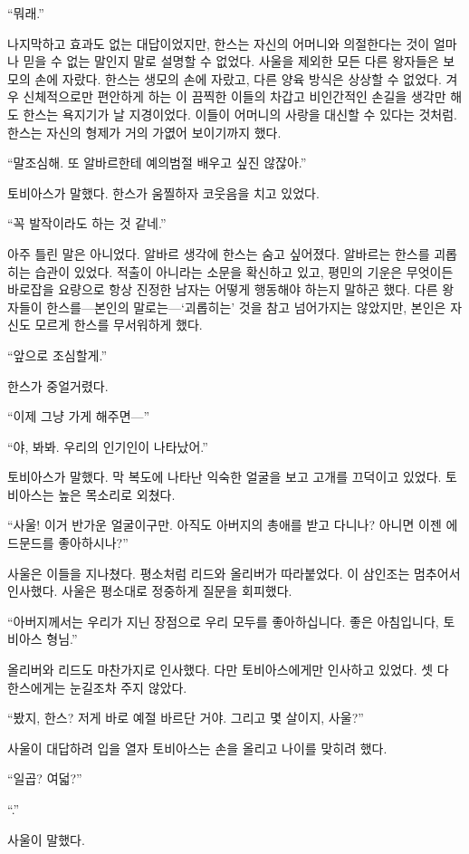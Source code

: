 ``뭐래.''

나지막하고 효과도 없는 대답이었지만, 한스는 자신의 어머니와 의절한다는 것이 얼마나 믿을 수 없는 말인지 말로 설명할 수 없었다. 사울을 제외한 모든 다른 왕자들은 보모의 손에 자랐다. 한스는 생모의 손에 자랐고, 다른 양육 방식은 상상할 수 없었다. 겨우 신체적으로만 편안하게 하는 이 끔찍한 이들의 차갑고 비인간적인 손길을 생각만 해도 한스는 욕지기가 날 지경이었다. 이들이 어머니의 사랑을 대신할 수 있다는 것처럼. 한스는 자신의 형제가 거의 가엾어 보이기까지 했다.

``말조심해. 또 알바르한테 예의범절 배우고 싶진 않잖아.''

토비아스가 말했다. 한스가 움찔하자 코웃음을 치고 있었다.

``꼭 발작이라도 하는 것 같네.''

아주 틀린 말은 아니었다. 알바르 생각에 한스는 숨고 싶어졌다. 알바르는 한스를 괴롭히는 습관이 있었다. 적출이 아니라는 소문을 확신하고 있고, 평민의 기운은 무엇이든 바로잡을 요량으로 항상 진정한 남자는 어떻게 행동해야 하는지 말하곤 했다. 다른 왕자들이 한스를—본인의 말로는—`괴롭히는' 것을 참고 넘어가지는 않았지만, 본인은 자신도 모르게 한스를 무서워하게 했다.

``앞으로 조심할게.''

한스가 중얼거렸다.

``이제 그냥 가게 해주면—''

``야, 봐봐. 우리의 인기인이 나타났어.''

토비아스가 말했다. 막 복도에 나타난 익숙한 얼굴을 보고 고개를 끄덕이고 있었다. 토비아스는 높은 목소리로 외쳤다.

``사울! 이거 반가운 얼굴이구만. 아직도 아버지의 총애를 받고 다니나? 아니면 이젠 에드문드를 좋아하시나?''

사울은 이들을 지나쳤다. 평소처럼 리드와 올리버가 따라붙었다. 이 삼인조는 멈추어서 인사했다. 사울은 평소대로 정중하게 질문을 회피했다.

``아버지께서는 우리가 지닌 장점으로 우리 모두를 좋아하십니다. 좋은 아침입니다, 토비아스 형님.''

올리버와 리드도 마찬가지로 인사했다. 다만 토비아스에게만 인사하고 있었다. 셋 다 한스에게는 눈길조차 주지 않았다.

``봤지, 한스? 저게 바로 예절 바르단 거야. 그리고 몇 살이지, 사울?''

사울이 대답하려 입을 열자 토비아스는 손을 올리고 나이를 맞히려 했다.

``일곱? 여덟?''

``.''

사울이 말했다.

